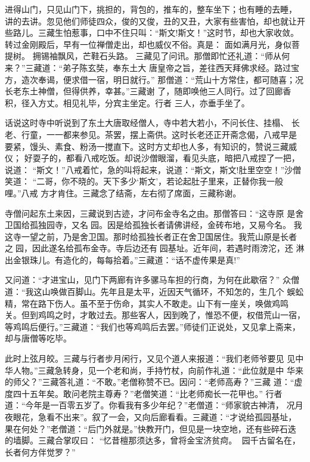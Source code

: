 进得山门，只见山门下，挑担的，背包的，推车的，整车坐下；也有睡的去睡，
讲的去讲。忽见他们师徒四众，俊的又俊，丑的又丑，大家有些害怕，却也就让开
些路儿。三藏生怕惹事，口中不住只叫：“斯文!斯文！”这时节，却也大家收敛。
转过金刚殿后，早有一位禅僧走出，却也威仪不俗。真是：
面如满月光，身似菩提树。
拥锡袖飘风，芒鞋石头路。
三藏见了问讯。那僧即忙还礼道：“师从何来？”三藏道：“弟子陈玄奘，奉东土大
唐皇帝之旨，差往西天拜佛求经。路过宝方，造次奉谒，便求借一宿，明日就行。”
那僧道：“荒山十方常住，都可随喜；况长老东土神僧，但得供养，幸甚。”三藏谢
了，随即唤他三人同行。过了回廊香积，径入方丈。相见礼毕，分宾主坐定。行者
三人，亦垂手坐了。

话说这时寺中听说到了东土大唐取经僧人，寺中若大若小，不问长住、挂榻、
长老、行童，一一都来参见。茶罢，摆上斋供。这时长老还正开斋念偈，八戒早是
要紧，馒头、素食、粉汤一搅直下。这时方丈却也人多，有知识的，赞说三藏威仪；
好耍子的，都看八戒吃饭。却说沙僧眼溜，看见头底，暗把八戒捏了一把，说道：
“斯文！”八戒着忙，急的叫将起来，说道：“斯文，斯文!肚里空空！”沙僧笑道：
“二哥，你不晓的。天下多少‘斯文’，若论起肚子里来，正替你我一般哩。”八戒
方才肯住。三藏念了结斋，左右彻了席面，三藏称谢。

寺僧问起东土来因，三藏说到古迹，才问布金寺名之由。那僧答曰：“这寺原
是舍卫国给孤独园寺，又名园。因是给孤独长者请佛讲经，金砖布地，又易今名。
我这寺一望之前，乃是舍卫国。那时给孤独长者正在舍卫国居住。我荒山原是长者
之园，因此遂名给孤布金寺。寺后边还有园基址。近年间，若遇时雨滂沱，还
淋出金银珠儿。有造化的，每每拾着。”三藏道：“话不虚传果是真!”

又问道：“才进宝山，见门下两廊有许多骡马车担的行商，为何在此歇宿？”
众僧道：“我这山唤做百脚山。先年且是太平，近因天气循环，不知怎的，生几个
蜈蚣精，常在路下伤人。虽不至于伤命，其实人不敢走。山下有一座关，唤做鸡鸣
关。但到鸡鸣之时，才敢过去。那些客人，因到晚了，惟恐不便，权借荒山一宿，
等鸡鸣后便行。”三藏道：“我们也等鸡鸣后去罢。”师徒们正说处，又见拿上斋来，
却与唐僧等吃毕。

此时上弦月皎。三藏与行者步月闲行，又见个道人来报道：“我们老师爷要见
见中华人物。”三藏急转身，见一个老和尚，手持竹杖，向前作礼道：“此位就是中
华来的师父？”三藏答礼道：“不敢。”老僧称赞不已。因问：“老师高寿？”三藏
道：“虚度四十五年矣。敢问老院主尊寿？”老僧笑道：“比老师痴长一花甲也。”
行者道：“今年是一百零五岁了。你看我有多少年纪？”老僧道：“师家貌古神清，
况月夜眼花，急看不出来”。叙了一会，又向后廊看看。三藏道：“才说给孤园基址，
果在何处？”老僧道：“后门外就是。”快教开门，但见是一块空地，还有些碎石迭
的墙脚。三藏合掌叹曰：
“忆昔檀那须达多，曾将金宝济贫疴。
园千古留名在，长者何方伴觉罗？”


